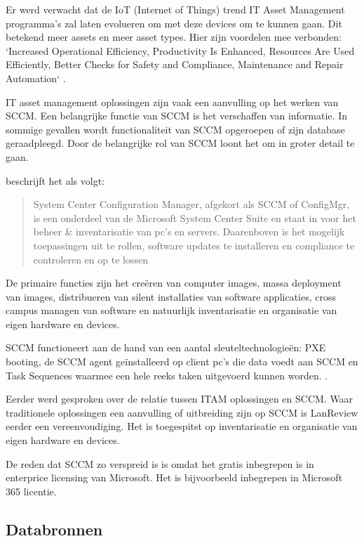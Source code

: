 Er werd verwacht dat de IoT (Internet of Things) trend IT Asset Management programma's zal laten evolueren om met deze devices om te kunnen gaan. Dit betekend meer assets en meer asset types. Hier zijn voordelen mee verbonden: `Increased Operational Efficiency, Productivity Is Enhanced, Resources Are Used Efficiently, Better Checks for Safety and Compliance, Maintenance and Repair Automation` \autocite{Badnakhe2020}.

IT asset management oplossingen zijn vaak een aanvulling op het werken van SCCM. Een belangrijke functie van SCCM is het verschaffen van informatie. In sommige gevallen wordt functionaliteit van SCCM opgeroepen of zijn database geraadpleegd. Door de belangrijke rol van SCCM loont het om in groter detail te gaan.

\textcite{Droogenbroot2016} beschrijft het als volgt:
\begin{quote}
    System Center Configuration Manager, afgekort als SCCM of ConfigMgr, is een onderdeel van de Microsoft System Center Suite en staat in voor het beheer \& inventarisatie van pc's en servers. Daarenboven is het mogelijk toepassingen uit te rollen, software updates te installeren en compliance te controleren en op te lossen
\end{quote}

De primaire functies zijn het creëren van computer images, massa deployment van images, distribueren van silent installaties van software applicaties, cross campus managen van software en natuurlijk inventarisatie en organisatie van eigen hardware en devices.

SCCM functioneert aan de hand van een aantal sleuteltechnologieën: PXE booting, de SCCM agent geïnstalleerd op client pc's die data voedt aan SCCM en Task Sequences waarmee een hele reeks taken uitgevoerd kunnen worden. \autocite{Spitze2019}.

Eerder werd gesproken over de relatie tussen ITAM oplossingen en SCCM. Waar traditionele oplossingen een aanvulling of uitbreiding zijn op SCCM is LanReview eerder een vereenvoudiging. Het is toegespitst op inventarisatie en organisatie van eigen hardware en devices.

De reden dat SCCM zo verspreid is is omdat het gratis inbegrepen is in enterprice licensing van Microsoft. Het is bijvoorbeeld inbegrepen in Microsoft 365 licentie. \autocite{MicrosoftDocs2020}

\subsection{Databronnen}

